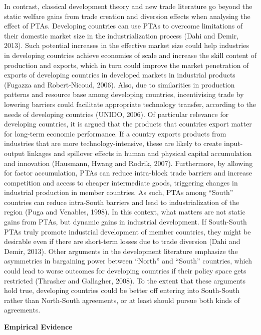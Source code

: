 In contrast, classical development theory and new trade literature go
beyond the static welfare gains from trade creation and diversion
effects when analysing the effect of PTAs. Developing countries can use
PTAs to overcome limitations of their domestic market size in the
industrialization process (Dahi and Demir, 2013). Such potential
increases in the effective market size could help industries in
developing countries achieve economies of scale and increase the skill
content of production and exports, which in turn could improve the
market penetration of exports of developing countries in developed
markets in industrial products (Fugazza and Robert-Nicoud, 2006). Also,
due to similarities in production patterns and resource base among
developing countries, incentivising trade by lowering barriers could
facilitate appropriate technology transfer, according to the needs of
developing countries (UNIDO, 2006). Of particular relevance for
developing countries, it is argued that the products that countries
export matter for long-term economic performance. If a country exports
products from industries that are more technology-intensive, these are
likely to create input-output linkages and spillover effects in human
and physical capital accumulation and innovation (Hausmann, Hwang and
Rodrik, 2007). Furthermore, by allowing for factor accumulation, PTAs
can reduce intra-block trade barriers and increase competition and
access to cheaper intermediate goods, triggering changes in industrial
production in member countries. As such, PTAs among ``South'' countries
can reduce intra-South barriers and lead to industrialization of the
region (Puga and Venables, 1998). In this context, what matters are not
static gains from PTAs, but dynamic gains in industrial development. If
South-South PTAs truly promote industrial development of member
countries, they might be desirable even if there are short-term losses
due to trade diversion (Dahi and Demir, 2013). Other arguments in the
development literature emphasize the asymmetries in bargaining power
between ``North'' and ``South'' countries, which could lead to worse
outcomes for developing countries if their policy space gets restricted
(Thrasher and Gallagher, 2008). To the extent that these arguments hold
true, developing countries could be better off entering into South-South
rather than North-South agreements, or at least should pursue both kinds
of agreements.

\textbf{Empirical Evidence}

